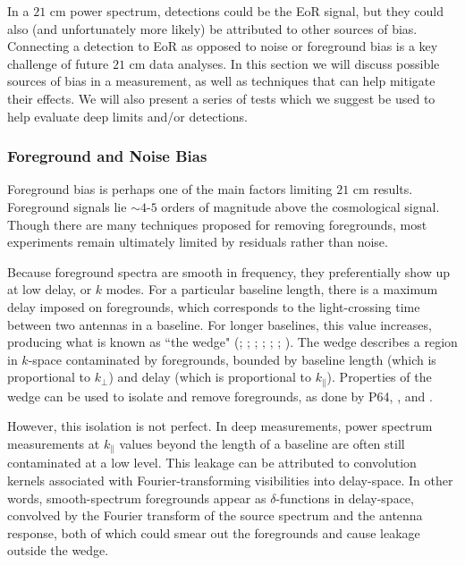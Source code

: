 \documentclass[preprint2,numberedappendix,tighten]{aastex6}  %
\begin{document}
In a $21$ cm power spectrum, detections could be the EoR signal, but they could also (and unfortunately more likely) be attributed to other sources of bias. Connecting a detection to EoR as opposed to noise or foreground bias is a key challenge of future $21$ cm data analyses. In this section we will discuss possible sources of bias in a measurement, as well as techniques that can help mitigate their effects. We will also present a series of tests which we suggest be used to help evaluate deep limits and/or detections.

\subsubsection{Foreground and Noise Bias}
\label{sec:BiasTypes}

Foreground bias is perhaps one of the main factors limiting $21$ cm results. Foreground signals lie $\sim4$-$5$ orders of magnitude above the cosmological signal. Though there are many techniques proposed for removing foregrounds, most experiments remain ultimately limited by residuals rather than noise.

Because foreground spectra are smooth in frequency, they preferentially show up at low delay, or $k$ modes. For a particular baseline length, there is a maximum delay imposed on foregrounds, which corresponds to the light-crossing time between two antennas in a baseline. For longer baselines, this value increases, producing what is known as ``the wedge" (\citealt{parsons_et_al2012b}; \citealt{liu_et_al2014a}; \citealt{liu_et_al2014b}; \citealt{vedantham_et_al2012}; \citealt{thyagarajan_et_al2013}; \citealt{pober_et_al2013}; \citealt{datta_et_al2010}). The wedge describes a region in $k$-space contaminated by foregrounds, bounded by baseline length (which is proportional to $k_{\perp}$) and delay (which is proportional to $k_{\parallel}$). Properties of the wedge can be used to isolate and remove foregrounds, as done by P64, \citet{parsons_et_al2014}, and \citet{jacobs_et_al2015}.

However, this isolation is not perfect.  In deep measurements, power spectrum measurements at $k_{\parallel}$ values beyond the length of a baseline are often still contaminated at a low level. This leakage can be attributed to convolution kernels associated with Fourier-transforming visibilities into delay-space. In other words, smooth-spectrum foregrounds appear as $\delta$-functions in delay-space, convolved by the Fourier transform of the source spectrum and the antenna response, both of which could smear out the foregrounds and cause leakage outside the wedge.
\end{document}
